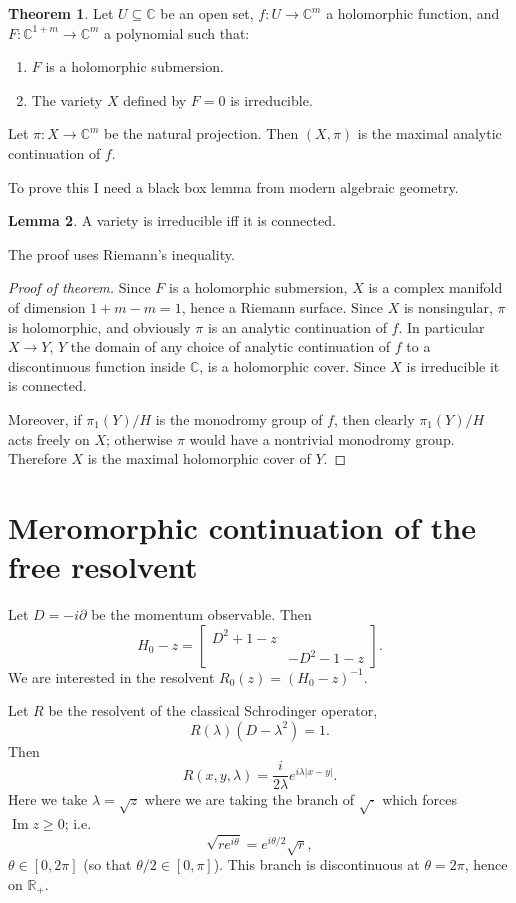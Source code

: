 \documentclass[12pt]{report}
\newcommand{\RR}{\mathbb{R}}
\newcommand{\CC}{\mathbb{C}}
\renewcommand{\Im}{\operatorname{Im}}
\theoremstyle{definition}
\newtheorem{theorem}{Theorem}[chapter]
\newtheorem{lemma}[theorem]{Lemma}
\begin{document}
\begin{theorem}
Let $U \subseteq \CC$ be an open set, $f: U \to \CC^m$ a holomorphic function, and $F: \CC^{1 + m} \to \CC^m$ a polynomial such that:
\begin{enumerate}
\item $F$ is a holomorphic submersion.
\item The variety $X$ defined by $F = 0$ is irreducible.
\end{enumerate}
Let $\pi: X \to \CC^m$ be the natural projection. Then $(X, \pi)$ is the maximal analytic continuation of $f$.
\end{theorem}
To prove this I need a black box lemma from modern algebraic geometry.
\begin{lemma}
A variety is irreducible iff it is connected.
\end{lemma}
The proof uses Riemann's inequality.
\begin{proof}[Proof of theorem]
Since $F$ is a holomorphic submersion, $X$ is a complex manifold of dimension $1+m - m = 1$, hence a Riemann surface.
Since $X$ is nonsingular, $\pi$ is holomorphic, and obviously $\pi$ is an analytic continuation of $f$.
In particular $X \to Y$, $Y$ the domain of any choice of analytic continuation of $f$ to a discontinuous function inside $\CC$, is a holomorphic cover.
Since $X$ is irreducible it is connected.

Moreover, if $\pi_1(Y)/H$ is the monodromy group of $f$, then clearly $\pi_1(Y)/H$ acts freely on $X$; otherwise $\pi$ would have a nontrivial monodromy group. Therefore $X$ is the maximal holomorphic cover of $Y$.
\end{proof}


\section{Meromorphic continuation of the free resolvent}
Let $D = -i\partial$ be the momentum observable.
Then
$$H_0 - z = \begin{bmatrix}
D^2 + 1 - z\\
&-D^2 - 1 -z
\end{bmatrix}.$$
We are interested in the resolvent $R_0(z) = (H_0 - z)^{-1}$.

Let $R$ be the resolvent of the classical Schrodinger operator,
$$R(\lambda)(D - \lambda^2) = 1.$$
Then
$$R(x, y, \lambda) = \frac{i}{2\lambda} e^{i\lambda|x-y|}.$$
Here we take $\lambda = \sqrt z$ where we are taking the branch of $\sqrt\cdot$ which forces $\Im z \geq 0$; i.e.
$$\sqrt{re^{i\theta}} = e^{i\theta/2}\sqrt r,$$
$\theta \in [0, 2\pi]$ (so that $\theta/2 \in [0, \pi]$). This branch is discontinuous at $\theta = 2\pi$, hence on $\RR_+$.
\end{document}

